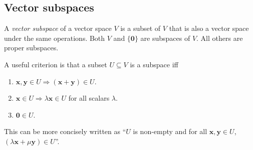 \documentclass[a4paper]{article}
\begin{document}
\subsection{Vector subspaces}
\begin{defi}
  A \emph{vector subspace} of a vector space $V$ is a subset of $V$ that is also a vector space under the same operations. Both $V$ and $\{\mathbf{0}\}$ are subspaces of $V$. All others are proper subspaces.

  A useful criterion is that a subset $U\subseteq V$ is a subspace iff
  \begin{enumerate}
    \item $\mathbf{x, y}\in U \Rightarrow (\mathbf{x + y}) \in U$.
    \item $\mathbf{x}\in U \Rightarrow \lambda\mathbf{x} \in U$ for all scalars $\lambda$.
    \item $\mathbf{0}\in U$.
  \end{enumerate}
  This can be more concisely written as ``$U$ is non-empty and for all $\mathbf{x, y}\in U$, $(\lambda\mathbf{x} + \mu\mathbf{y})\in U$''.
\end{defi}
\end{document}
